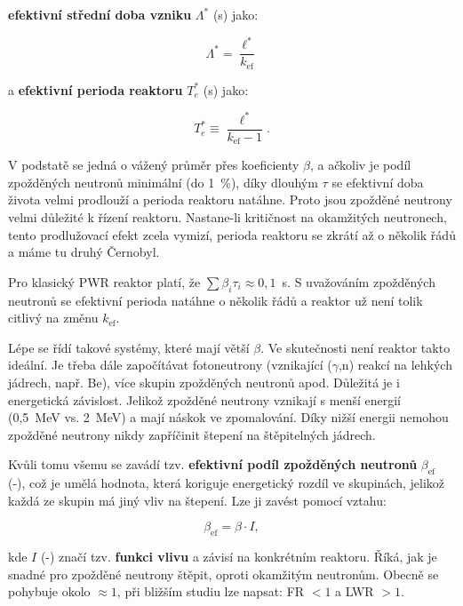\textbf{efektivní střední doba vzniku} $\Lambda^*$ (s) jako:

\begin{equation}
  \boxed{
  \Lambda^* = \dfrac{\ell^*}{k_{\text{ef}}}
  \label{efektivni_stredni_doba_vzniku}}
\end{equation}

a \textbf{efektivní perioda reaktoru} $T_e^*$ (s) jako:

\begin{equation}
  \boxed{
  T_e^* \equiv \dfrac{\ell^*}{k_{\text{ef}} - 1}.
  \label{efektivni_perioda}}
\end{equation}

V podstatě se jedná o vážený průměr přes koeficienty $\beta$, a ačkoliv je podíl zpožděných neutronů minimální (do 1~\%), díky dlouhým $\tau$ se efektivní doba života velmi prodlouží a perioda reaktoru natáhne. Proto jsou zpožděné neutrony velmi důležité k řízení reaktoru. Nastane-li kritičnost na okamžitých neutronech, tento prodlužovací efekt zcela vymizí, perioda reaktoru se zkrátí až o několik řádů a máme tu druhý Černobyl.

Pro klasický PWR reaktor platí, že $\sum \beta_i \tau_i \approx 0,1$~s. S uvažováním zpožděných neutronů se efektivní perioda natáhne o několik řádů a reaktor už není tolik citlivý na změnu $k_{\text{ef}}$.

Lépe se řídí takové systémy, které mají větší $\beta$. Ve skutečnosti není reaktor takto ideální. Je třeba dále započítávat fotoneutrony (vznikající ($\gamma$,n) reakcí na lehkých jádrech, např. Be), více skupin zpožděných neutronů apod. Důležitá je i energetická závislost. Jelikož zpožděné neutrony vznikají s menší energií (0,5~MeV vs. 2~MeV) a mají náskok ve zpomalování. Díky nižší energii nemohou zpožděné neutrony nikdy zapříčinit štepení na štěpitelných jádrech.

Kvůli tomu všemu se zavádí tzv. \textbf{efektivní podíl zpožděných neutronů} $\beta_{\text{ef}}$ (-), což je umělá hodnota, která koriguje energetický rozdíl ve skupinách, jelikož každá ze skupin má jiný vliv na štepení. Lze ji zavést pomocí vztahu:

\begin{equation}
  \beta_{\text{ef}} = \beta \cdot I,
\end{equation}

kde $I$ (-) značí tzv. \textbf{funkci vlivu} a závisí na konkrétním reaktoru. Říká, jak je snadné pro zpožděné neutrony štěpit, oproti okamžitým neutronům. Obecně se pohybuje okolo $\approx 1$, při bližším studiu lze napsat: FR $<1$ a LWR $>1$.

